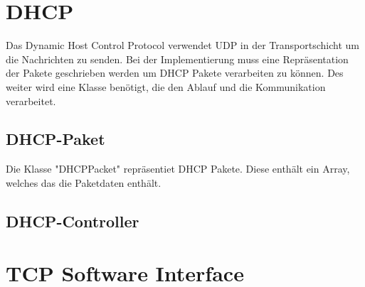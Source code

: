 \section{DHCP}
Das Dynamic Host Control Protocol verwendet UDP in der Transportschicht um die Nachrichten zu senden. Bei der Implementierung muss eine Repräsentation der Pakete geschrieben werden um DHCP Pakete verarbeiten zu können. Des weiter wird eine Klasse benötigt, die den Ablauf und die Kommunikation verarbeitet. 

\subsection{DHCP-Paket}
Die Klasse "DHCPPacket" repräsentiet DHCP Pakete. Diese enthält ein Array, welches das die Paketdaten enthält.  



\subsection{DHCP-Controller}

\section{TCP Software Interface}

